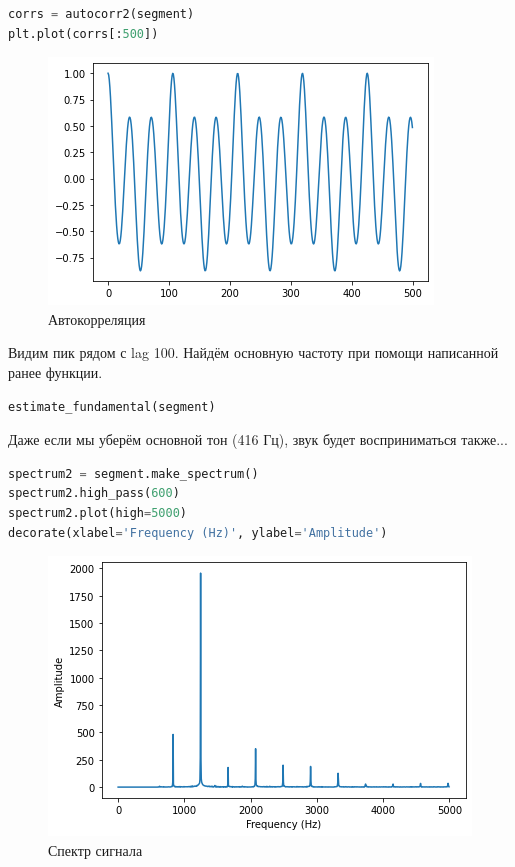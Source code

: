 \begin{lstlisting}[language=Python]
corrs = autocorr2(segment)
plt.plot(corrs[:500])
\end{lstlisting}
\begin{figure}[H]
	\begin{center}
		\includegraphics[scale=1]{fig/lab05/lab05_46_1.png}
		\caption{Автокорреляция}
	\end{center}
\end{figure}

Видим пик рядом с lag 100. Найдём основную частоту при помощи написанной ранее функции.

\begin{lstlisting}[language=Python]
estimate_fundamental(segment)
\end{lstlisting}

Даже если мы уберём основной тон (416 Гц), звук будет восприниматься также...

\begin{lstlisting}[language=Python]
spectrum2 = segment.make_spectrum()
spectrum2.high_pass(600)
spectrum2.plot(high=5000)
decorate(xlabel='Frequency (Hz)', ylabel='Amplitude')
\end{lstlisting}
\begin{figure}[H]
	\begin{center}
		\includegraphics[scale=1]{fig/lab05/lab05_51_0.png}
		\caption{Спектр сигнала}
	\end{center}
\end{figure}

